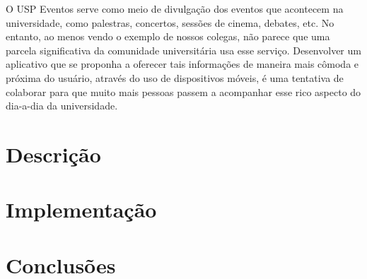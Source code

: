 \documentclass[brazil]{article}
\begin{document}
O USP Eventos serve como
meio de divulgação dos eventos que acontecem na universidade, como palestras,
concertos, sessões de cinema, debates, etc. No entanto, ao
menos vendo o exemplo de nossos colegas, não parece que uma parcela
significativa da comunidade universitária usa esse serviço.
Desenvolver um aplicativo que se proponha a oferecer tais informações de
maneira mais cômoda e próxima do usuário, através do uso de dispositivos
móveis, é uma tentativa de colaborar para que muito mais pessoas passem a
acompanhar esse rico aspecto do dia-a-dia da universidade.


\section{Descrição}


\section{Implementação}


\section{Conclusões}
\end{document}
